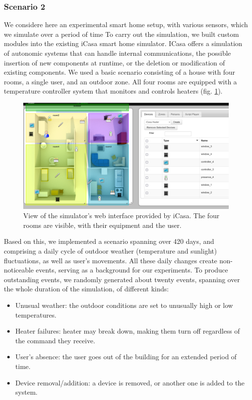 \documentclass[entropy,article,submit,moreauthors,pdftex]{Definitions/mdpi}
\begin{document}
\subsubsection{Scenario 2}
We considere here an experimental smart home setup, with various sensors, which we simulate over a period of time
To carry out the simulation, we built custom modules into the existing iCasa
smart home simulator\cite{lalanda_self-aware_2017}. ICasa
offers a simulation of autonomic systems that can handle internal communications,
the possible insertion of new components at runtime, or the deletion or modification of existing
components. We used a basic scenario consisting of a house with four rooms,
a single user, and an outdoor zone. All four rooms are equipped
with a temperature controller system that monitors and controls heaters (fig.
\ref{fig:view}).

\begin{figure}[ht]
    \centering
\includegraphics[width=.8\linewidth]{figures/simulator}
    \caption{View of the simulator's web interface provided by iCasa. The four
        rooms are visible, with their equipment and the user.}
    \label{fig:view}
\end{figure}

Based on this, we implemented a scenario spanning over 420 days, and
comprising a daily cycle of outdoor weather (temperature and sunlight) fluctuations, as well
as user's movements. All these daily changes create non-noticeable events,
serving as a background for our experiments. To produce outstanding
events, we randomly generated about twenty events, spanning over the whole
duration of the simulation, of different kinds:

\begin{itemize}
    \item Unusual weather: the outdoor conditions are set to unusually high or
          low temperatures.
    \item Heater failures: heater may break down, making them turn off regardless
          of the command they receive.
    \item User's absence: the user goes out of the building for an extended
          period of time.
    \item Device removal/addition: a device is removed, or another one is added
          to the system.
\end{itemize}
\end{document}
